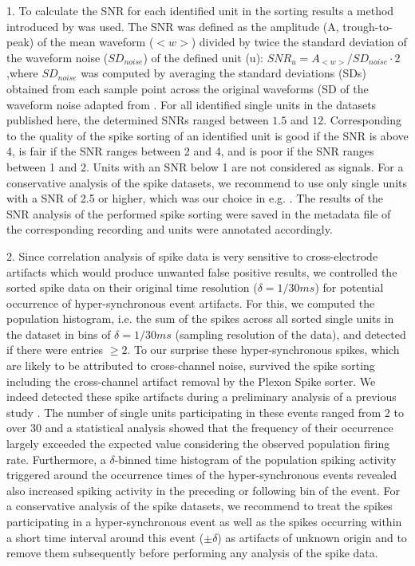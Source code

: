{1. To calculate the SNR for each identified unit in the sorting results a method introduced by \cite{Hatsopoulos_2004} was used. The SNR was defined as the amplitude (A, trough-to-peak) of the mean waveform ($<w>$) divided by twice the standard deviation of the waveform noise ($SD_{noise}$) of the defined unit (u): $SNR_{u}=A_{<w>}/SD_{noise}\cdot2$,where $SD_{noise}$ was computed by averaging the standard deviations (SDs) obtained from each sample point across the original waveforms (SD of the waveform noise adapted from \cite{Nordhausen_1996,  Suner_2005}. For all identified single units in the datasets published here, the determined SNRs ranged between $1.5$ and $12$. Corresponding to \cite{Suner_2005} the quality of the spike sorting of an identified unit is good if the SNR is above 4, is fair if the SNR ranges between 2 and 4, and is poor if the SNR ranges between 1 and 2. Units with an SNR below 1 are not considered as signals. For a conservative analysis of the spike datasets, we recommend to use only single units with a SNR of 2.5 or higher, which was our choice in e.g. \cite{Torre_2016}. The results of the SNR analysis of the performed spike sorting were saved in the  metadata file of the corresponding recording and units were annotated accordingly. 

2. Since correlation analysis of spike data is very sensitive to cross-electrode artifacts which would produce unwanted false positive results, we controlled the sorted spike data on their original time resolution ($\delta=1/30ms$) for potential occurrence of hyper-synchronous event artifacts. For this, we computed the population histogram, i.e. the sum of the spikes across all sorted single units in the dataset in bins of $\delta=1/30ms$ (sampling resolution of the data), and detected if there were entries $\ge2$. To our surprise these hyper-synchronous spikes, which are likely to be attributed to cross-channel noise, survived the spike sorting including the cross-channel artifact removal by the Plexon Spike sorter. We indeed detected these spike artifacts during a preliminary analysis of a previous study \cite{Torre_2016}. The number of single units participating in these events ranged from 2 to over 30 and a statistical analysis showed that the frequency of their occurrence largely exceeded the expected value considering the observed population firing rate. Furthermore, a $\delta$-binned time histogram of the population spiking activity triggered around the occurrence times of the hyper-synchronous events revealed also increased spiking activity in the preceding or following bin of the event. For a conservative analysis of the spike datasets, we recommend to treat the spikes participating in a hyper-synchronous event as well as the spikes occurring within a short time interval around this event ($\scriptstyle \pm\delta$) as artifacts of unknown origin and to remove them subsequently before performing any analysis of the spike data.

}

